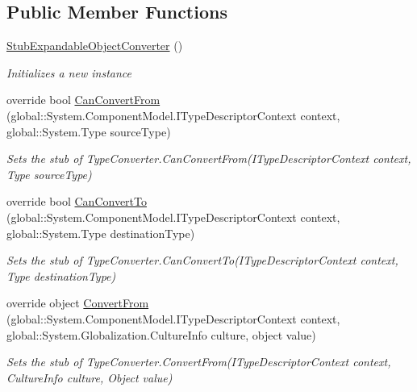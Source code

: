 \subsection*{Public Member Functions}
\begin{DoxyCompactItemize}
\item 
\hyperlink{class_system_1_1_component_model_1_1_fakes_1_1_stub_expandable_object_converter_a5b3fa936f7b6bcd74aae94f89c310414}{Stub\-Expandable\-Object\-Converter} ()
\begin{DoxyCompactList}\small\item\em Initializes a new instance\end{DoxyCompactList}\item 
override bool \hyperlink{class_system_1_1_component_model_1_1_fakes_1_1_stub_expandable_object_converter_aa48d7b897c2960c3645b6f15d1617d3b}{Can\-Convert\-From} (global\-::\-System.\-Component\-Model.\-I\-Type\-Descriptor\-Context context, global\-::\-System.\-Type source\-Type)
\begin{DoxyCompactList}\small\item\em Sets the stub of Type\-Converter.\-Can\-Convert\-From(\-I\-Type\-Descriptor\-Context context, Type source\-Type)\end{DoxyCompactList}\item 
override bool \hyperlink{class_system_1_1_component_model_1_1_fakes_1_1_stub_expandable_object_converter_ab85062da500db97667f9021b1f9bcafa}{Can\-Convert\-To} (global\-::\-System.\-Component\-Model.\-I\-Type\-Descriptor\-Context context, global\-::\-System.\-Type destination\-Type)
\begin{DoxyCompactList}\small\item\em Sets the stub of Type\-Converter.\-Can\-Convert\-To(\-I\-Type\-Descriptor\-Context context, Type destination\-Type)\end{DoxyCompactList}\item 
override object \hyperlink{class_system_1_1_component_model_1_1_fakes_1_1_stub_expandable_object_converter_a5a91792cc9edde632efec8cb33289746}{Convert\-From} (global\-::\-System.\-Component\-Model.\-I\-Type\-Descriptor\-Context context, global\-::\-System.\-Globalization.\-Culture\-Info culture, object value)
\begin{DoxyCompactList}\small\item\em Sets the stub of Type\-Converter.\-Convert\-From(\-I\-Type\-Descriptor\-Context context, Culture\-Info culture, Object value)\end{DoxyCompactList}\item 

\end{DoxyCompactItemize}
